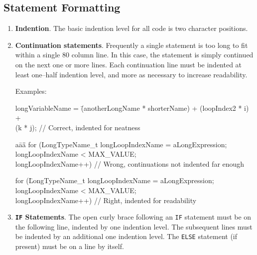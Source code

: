 \documentclass[11pt]{article}
\begin{document}
\subsection{Statement Formatting}
\begin{enumerate}
\item {\bf Indention}.  The basic indention level for all code
is two character positions. 
\item {\bf Continuation statements}.  Frequently a single statement
is too long to fit within a single 80 column line.  In this case, the
statement is simply continued on the next one or more lines.  Each
continuation line must be indented at least one--half indention level,
and more as necessary to increase readability.  

Examples:

\begin{tt}
\begin{tabbing}
longVariableName = \=(anotherLongName * shorterName) + (loopIndex2 * i) + \\
\>(k * j); // Correct, indented for neatness
\end{tabbing}
\end{tt}

\begin{tt}
\begin{tabbing}
a\=a\=a\= \kill
for (LongTypeName\_t longLoopIndexName = aLongExpression; \\
\>longLoopIndexName < MAX\_VALUE; \\
\>longLoopIndexName++) // Wrong, continuations not indented far enough
\end{tabbing}
\end{tt}

\begin{tt}
\begin{tabbing}
for (\=LongTypeName\_t longLoopIndexName = aLongExpression; \\
\>longLoopIndexName < MAX\_VALUE; \\
\>longLoopIndexName++) // Right, indented for readability
\end{tabbing}
\end{tt}

\item {\bf {\tt IF} Statements}.
The open curly brace following an {\tt IF} statement must be on the
following line, indented by one  indention level.
The subsequent lines must be
indented by an additional one indention level.
The {\tt ELSE} statement (if present)
must be on a line by itself.


\end{enumerate}
\end{document}
